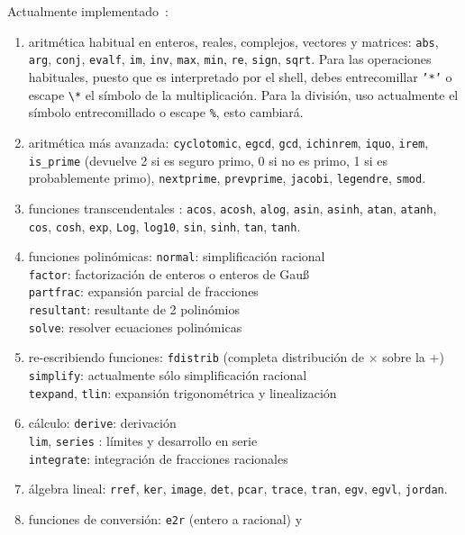 \documentclass{article}
\begin{document}
Actualmente implementado~:
\begin{enumerate}
\item aritm\'etica habitual en enteros, reales, complejos, vectores y matrices:
{\tt abs},  {\tt arg},  {\tt conj},
{\tt evalf},  {\tt im}, {\tt inv},  {\tt max}, {\tt min}, 
{\tt re}, {\tt sign},  {\tt sqrt}.
Para las operaciones habituales, puesto que {\tt *} es interpretado por el shell, 
debes entrecomillar {\tt '*'} o escape \verb|\*| el s\'imbolo de la multiplicaci\'on. 
Para la divisi\'on, uso actualmente el s\'imbolo entrecomillado o escape {\tt \%}, esto cambiar\'a.
\item aritm\'etica m\'as avanzada: {\tt cyclotomic}, {\tt egcd}, {\tt gcd}, 
{\tt ichinrem}, {\tt iquo}, {\tt irem}, \verb|is_prime| (devuelve 2 si
es seguro primo, 0 si no es primo, 1 si es probablemente primo), 
{\tt nextprime}, {\tt prevprime}, {\tt jacobi}, {\tt legendre}, {\tt smod}.
\item funciones transcendentales : {\tt acos}, {\tt acosh}, {\tt alog},  
{\tt asin}, {\tt asinh}, {\tt atan}, {\tt atanh}, 
{\tt cos}, {\tt cosh}, {\tt exp}, {\tt Log}, {\tt log10},  
{\tt sin}, {\tt sinh}, {\tt tan}, {\tt tanh}. 
\item funciones polin\'omicas: {\tt normal}: simplificaci\'on racional\\
{\tt factor}: factorizaci\'on de enteros o enteros de Gau\ss\ \\
{\tt partfrac}:  expansi\'on parcial de fracciones \\
{\tt resultant}: resultante de 2 polin\'omios \\
{\tt solve}: resolver ecuaciones polin\'omicas
\item re-escribiendo funciones: {\tt fdistrib} (completa distribuci\'on de $\times$ sobre la $+$)\\
 {\tt simplify}: actualmente s\'olo simplificaci\'on racional \\
{\tt texpand}, {\tt tlin}: expansi\'on trigonom\'etrica y linealizaci\'on
\item c\'alculo: {\tt derive}: derivaci\'on\\
{\tt lim}, {\tt series} : l\'imites y desarrollo en serie \\
{\tt integrate}: integraci\'on de fracciones racionales
\item \'algebra lineal: {\tt rref}, {\tt ker}, {\tt image}, {\tt det}, 
{\tt pcar}, {\tt trace}, {\tt tran}, {\tt egv}, {\tt egvl}, 
{\tt jordan}.
\item funciones de conversi\'on: {\tt e2r} (entero a racional) y

\end{enumerate}
\end{document}
